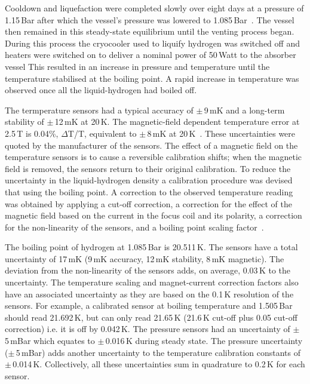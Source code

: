Cooldown and liquefaction were completed slowly over eight days at a
pressure of 1.15\,Bar after which the vessel's pressure was lowered to
1.085\,Bar~\cite{1748-0221-13-09-T09008}.
The vessel then remained in this steady-state equilibrium until the
venting process began.
During this process the cryocooler used to liquify hydrogen was
switched off and heaters were switched on to deliver a nominal power
of 50\,Watt to the absorber vessel
This resulted in an increase in pressure and temperature until the
temperature stabilised at the boiling point.
A rapid increase in temperature was observed once all the
liquid-hydrogen had boiled off. 

The termperature sensors had a typical accuracy of
$\mathrm{\pm}$\,9\,mK and a long-term stability of
$\mathrm{\pm}$\,12\,mK at 20\,K.
The magnetic-field dependent temperature error at 2.5\,T is 0.04\%,
$\Delta$T/T, equivalent to $\mathrm{\pm}$\,8\,mK at
20\,K~\cite{CernoxRTDs}\cite{TemperatureMeasurement}.
These uncertainties were quoted by the manufacturer of the sensors.
The effect of a magnetic field on the temperature sensors is to cause
a reversible calibration shifts; when the magnetic field is removed,
the sensors return to their original calibration.
To reduce the uncertainty in the liquid-hydrogen density a calibration
procedure was devised that using the boiling point.
A correction to the observed temperature reading was obtained by
applying a cut-off correction, a correction for the effect of the
magnetic field based on the current in the focus coil and its
polarity, a correction for the non-linearity of the sensors, and a 
boiling point scaling factor~\cite{NOTE524}.  
 
The boiling point of hydrogen at 1.085\,Bar is 20.511\,K.
The sensors have a total uncertainty of 17\,mK (9\,mK accuracy, 12\,mK
stability, 8\,mK magnetic).
The deviation from the non-linearity of the sensors adds, on average,
0.03\,K to the uncertainty.
The temperature scaling and magnet-current correction factors also
have an associated uncertainty as they are based on the 0.1\,K
resolution of the sensors.  
For example, a calibrated sensor at boiling temperature and 1.505\,Bar
should read 21.692\,K, but can only read 21.65\,K (21.6\,K cut-off
plus 0.05 cut-off correction) i.e. it is off by 0.042\,K.
The pressure sensors had an uncertainty of $\mathrm{\pm}$\,5\,mBar
which equates to $\mathrm{\pm}$\,0.016\,K during steady state.
The pressure uncertainty ($\mathrm{\pm}$\,5\,mBar) adds another
uncertainty to the temperature calibration constants of
$\mathrm{\pm}$\,0.014\,K.
Collectively, all these uncertainties sum in quadrature to 0.2\,K for
each sensor.
 
